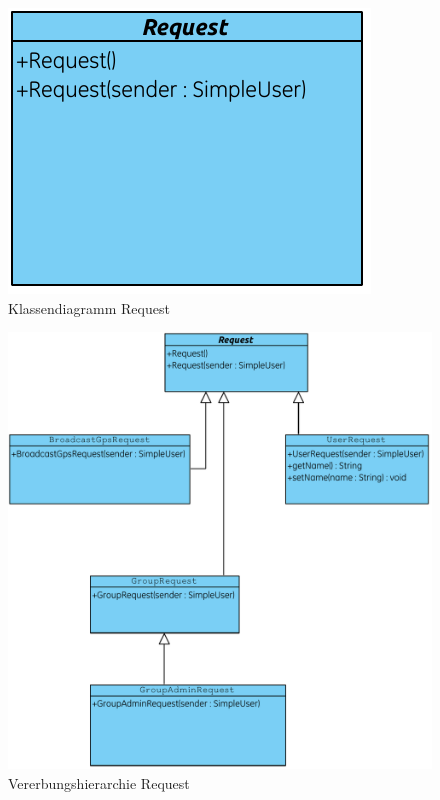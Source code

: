 \begin{figure}[h]
     \centering
     \includegraphics[scale=1.0,trim=2 2 2 2,clip=true]{servergraphs/request.pdf}
     \caption{Klassendiagramm Request}
\end{figure}
\clearpage

\begin{figure}[h]
\hspace*{-1.8cm}\includegraphics[scale=1.0,trim=2 2 2 2,clip=true]{servergraphs/communication-request.pdf}
     \caption{Vererbungshierarchie Request}
\end{figure}
\clearpage

